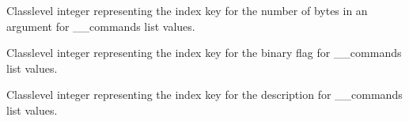 \documentclass[letterpaper,10pt,english]{sphinxmanual}
\begin{document}
\begin{fulllineitems}

\begin{fulllineitems}
\label{\detokenize{PodApi.Commands:PodApi.Commands.PodCommands.CommandSet.__ARGUMENTS}}
\pysigstartsignatures
{}
\pysigstopsignatures
\sphinxAtStartPar
Class\sphinxhyphen{}level integer representing the index key for the number of bytes in an     argument for \_\_commands list values.

\end{fulllineitems}


\begin{fulllineitems}
\label{\detokenize{PodApi.Commands:PodApi.Commands.PodCommands.CommandSet.__BINARY}}
\pysigstartsignatures
{}
\pysigstopsignatures
\sphinxAtStartPar
Class\sphinxhyphen{}level integer representing the index key for the binary flag for \_\_commands     list values.

\end{fulllineitems}


\begin{fulllineitems}
\label{\detokenize{PodApi.Commands:PodApi.Commands.PodCommands.CommandSet.__DESCRIPTION}}
\pysigstartsignatures
{}
\pysigstopsignatures
\sphinxAtStartPar
Class\sphinxhyphen{}level integer representing the index key for the description for \_\_commands     list values.

\end{fulllineitems}


\end{fulllineitems}
\end{document}
